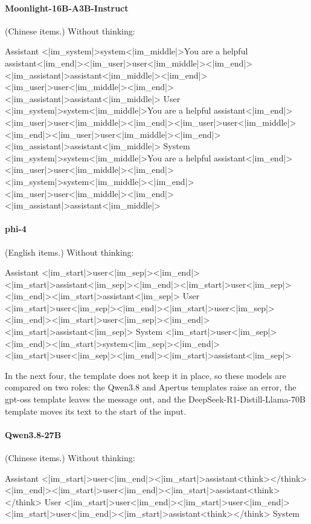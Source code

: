 \paragraph{Moonlight-16B-A3B-Instruct} (Chinese items.)
\noindent Without thinking:
\begin{Rendering}
Assistant  <|im_system|>system<|im_middle|>You are a helpful assistant<|im_end|><|im_user|>user<|im_middle|><|im_end|><|im_assistant|>assistant<|im_middle|><|im_end|><|im_user|>user<|im_middle|><|im_end|><|im_assistant|>assistant<|im_middle|>
User       <|im_system|>system<|im_middle|>You are a helpful assistant<|im_end|><|im_user|>user<|im_middle|><|im_end|><|im_user|>user<|im_middle|><|im_end|><|im_user|>user<|im_middle|><|im_end|><|im_assistant|>assistant<|im_middle|>
System     <|im_system|>system<|im_middle|>You are a helpful assistant<|im_end|><|im_user|>user<|im_middle|><|im_end|><|im_system|>system<|im_middle|><|im_end|><|im_user|>user<|im_middle|><|im_end|><|im_assistant|>assistant<|im_middle|>
\end{Rendering}
\paragraph{phi-4} (English items.)
\noindent Without thinking:
\begin{Rendering}
Assistant  <|im_start|>user<|im_sep|><|im_end|><|im_start|>assistant<|im_sep|><|im_end|><|im_start|>user<|im_sep|><|im_end|><|im_start|>assistant<|im_sep|>
User       <|im_start|>user<|im_sep|><|im_end|><|im_start|>user<|im_sep|><|im_end|><|im_start|>user<|im_sep|><|im_end|><|im_start|>assistant<|im_sep|>
System     <|im_start|>user<|im_sep|><|im_end|><|im_start|>system<|im_sep|><|im_end|><|im_start|>user<|im_sep|><|im_end|><|im_start|>assistant<|im_sep|>
\end{Rendering}

In the next four, the template does not keep it in place, so these models are compared on two roles: the Qwen3.8 and Apertus templates raise an error, the gpt-oss template leaves the message out, and the DeepSeek-R1-Distill-Llama-70B template moves its text to the start of the input.

\paragraph{Qwen3.8-27B} (Chinese items.)
\noindent Without thinking:
\begin{Rendering}
Assistant  <|im_start|>user\NL{}<|im_end|>\NL{}<|im_start|>assistant\NL{}<think>\NL{}\NL{}</think>\NL{}\NL{}<|im_end|>\NL{}<|im_start|>user\NL{}<|im_end|>\NL{}<|im_start|>assistant\NL{}<think>\NL{}\NL{}</think>\NL{}\NL{}
User       <|im_start|>user\NL{}<|im_end|>\NL{}<|im_start|>user\NL{}<|im_end|>\NL{}<|im_start|>user\NL{}<|im_end|>\NL{}<|im_start|>assistant\NL{}<think>\NL{}\NL{}</think>\NL{}\NL{}
System     
\end{Rendering}
